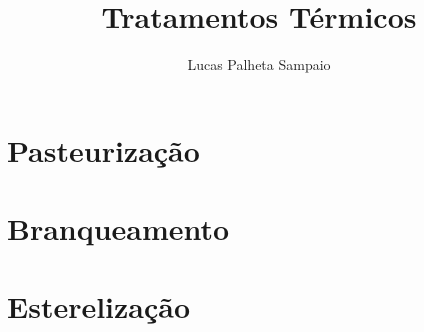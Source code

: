 \documentclass[12pt,a4paper]{article}
\author{Lucas Palheta Sampaio}
\title{Tratamentos Térmicos}
\begin{document}
\maketitle

\section{Pasteurização}
\section{Branqueamento}
\section{Esterelização}
\end{document}
